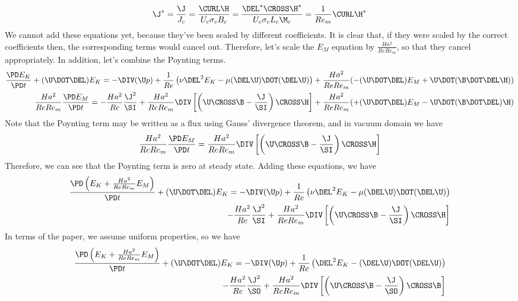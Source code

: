 \documentclass[landscape, 11pt]{article}
\begin{document}
\begin{equation}
	\J^* = \frac{\J}{J_c} = \frac{\CURL \H}{U_c \sigma_c B_c} = \frac{\DEL^* \CROSS \H^*}{U_c \sigma_c L_c \M_c} = \frac{1}{Re_m} \CURL \H^*
\end{equation}
We cannot add these equations yet, because they've been scaled by different coefficients. It is clear that, if they were scaled by the correct coefficients then, the corresponding terms would cancel out. Therefore, let's scale the $E_M$ equation by $\frac{Ha^2}{Re Re_m}$, so that they cancel appropriately. In addition, let's combine the Poynting terms.
\begin{equation}\begin{aligned}
	\frac{\PD E_K}{\PD t}
	+ (\U \DOT \DEL) E_K
	=
	- \DIV (\U p)
	+ \frac{1}{Re} \left( \nu \DEL^2 E_K -  \mu (\DEL \U) \DOT (\DEL \U) \right)
	+ \frac{Ha^2}{Re Re_m} (  - (\U \DOT \DEL) E_M + \U \DOT (\B \DOT \DEL \H) )
	\\
	\frac{Ha^2}{Re Re_m} \frac{\PD E_M}{\PD t} =
	- \frac{Ha^2}{Re} \frac{\J^2}{\SI}
	+ \frac{Ha^2}{Re Re_m} \DIV \left[\left(\U \CROSS \B - \frac{\J}{\SI} \right) \CROSS \H \right]
	+ \frac{Ha^2}{Re Re_m} ( + (\U \DOT \DEL) E_M - \U \DOT (\B \DOT \DEL) \H )
\end{aligned}\end{equation}
Note that the Poynting term may be written as a flux using Gauss' divergence theorem, and in vacuum domain we have
\begin{equation}\begin{aligned}
	\frac{Ha^2}{Re Re_m} \frac{\PD E_M}{\PD t} =
	\frac{Ha^2}{Re Re_m} \DIV \left[\left(\U \CROSS \B - \frac{\J}{\SI} \right) \CROSS \H \right]
\end{aligned}\end{equation}
Therefore, we can see that the Poynting term is zero at steady state. Adding these equations, we have
\begin{equation}\begin{aligned}
	\frac{\PD \left( E_K + \frac{Ha^2}{Re Re_m} E_M \right)}{\PD t}
	+ (\U \DOT \DEL) E_K
	=
	- \DIV (\U p)
	+ \frac{1}{Re} \left( \nu \DEL^2 E_K -  \mu (\DEL \U) \DOT (\DEL \U) \right) \\
	- \frac{Ha^2}{Re} \frac{\J^2}{\SI}
	+ \frac{Ha^2}{Re Re_m} \DIV \left[\left(\U \CROSS \B - \frac{\J}{\SI} \right) \CROSS \H \right]
\end{aligned}\end{equation}
In terms of the paper, we assume uniform properties, so we have
\begin{equation}\begin{aligned}
	\frac{\PD \left( E_K + \frac{Ha^2}{Re Re_m} E_M \right)}{\PD t}
	+ (\U \DOT \DEL) E_K
	=
	- \DIV (\U p)
	+ \frac{1}{Re} \left( \DEL^2 E_K - (\DEL \U) \DOT (\DEL \U) \right) \\
	- \frac{Ha^2}{Re} \frac{\J^2}{\SO}
	+ \frac{Ha^2}{Re Re_m} \DIV \left[\left(\U \CROSS \B - \frac{\J}{\SO} \right) \CROSS \B \right]
\end{aligned}\end{equation}
\end{document}
